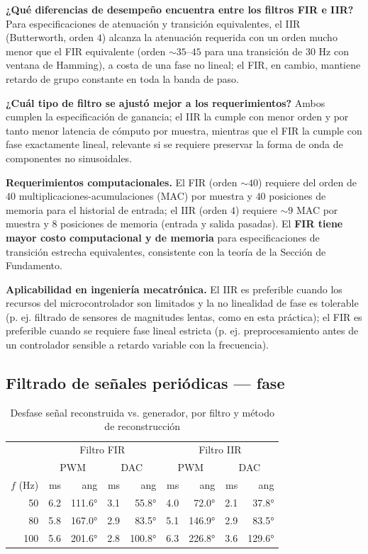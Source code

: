 \textbf{¿Qué diferencias de desempeño encuentra entre los filtros FIR e IIR?} Para especificaciones de atenuación y transición equivalentes, el IIR (Butterworth, orden $4$) alcanza la atenuación requerida con un orden mucho menor que el FIR equivalente (orden $\sim 35$--$45$ para una transición de $30$ Hz con ventana de Hamming), a costa de una fase no lineal; el FIR, en cambio, mantiene retardo de grupo constante en toda la banda de paso.

\textbf{¿Cuál tipo de filtro se ajustó mejor a los requerimientos?} Ambos cumplen la especificación de ganancia; el IIR la cumple con menor orden y por tanto menor latencia de cómputo por muestra, mientras que el FIR la cumple con fase exactamente lineal, relevante si se requiere preservar la forma de onda de componentes no sinusoidales.

\textbf{Requerimientos computacionales.} El FIR (orden $\sim 40$) requiere del orden de $40$ multiplicaciones-acumulaciones (MAC) por muestra y $40$ posiciones de memoria para el historial de entrada; el IIR (orden $4$) requiere $\sim 9$ MAC por muestra y $8$ posiciones de memoria (entrada y salida pasadas). El \textbf{FIR tiene mayor costo computacional y de memoria} para especificaciones de transición estrecha equivalentes, consistente con la teoría de la Sección de Fundamento.

\textbf{Aplicabilidad en ingeniería mecatrónica.} El IIR es preferible cuando los recursos del microcontrolador son limitados y la no linealidad de fase es tolerable (p. ej. filtrado de sensores de magnitudes lentas, como en esta práctica); el FIR es preferible cuando se requiere fase lineal estricta (p. ej. preprocesamiento antes de un controlador sensible a retardo variable con la frecuencia).

\subsection{Filtrado de señales periódicas — fase}

\begin{table}[!t]
\centering
\caption{Desfase señal reconstruida vs. generador, por filtro y método de reconstrucción}
\label{tab:desfase}
\small
\begin{tabular}{@{}r r r r r r r r r@{}}
\toprule
& \multicolumn{4}{c}{Filtro FIR} & \multicolumn{4}{c}{Filtro IIR} \\
& \multicolumn{2}{c}{PWM} & \multicolumn{2}{c}{DAC} & \multicolumn{2}{c}{PWM} & \multicolumn{2}{c}{DAC} \\
$f$ (Hz) & ms & ang & ms & ang & ms & ang & ms & ang \\
\midrule
50  & 6.2 & 111.6° & 3.1 & 55.8°  & 4.0 & 72.0°  & 2.1 & 37.8° \\
80  & 5.8 & 167.0° & 2.9 & 83.5°  & 5.1 & 146.9° & 2.9 & 83.5° \\
100 & 5.6 & 201.6° & 2.8 & 100.8° & 6.3 & 226.8° & 3.6 & 129.6° \\
\bottomrule
\end{tabular}
\end{table}

